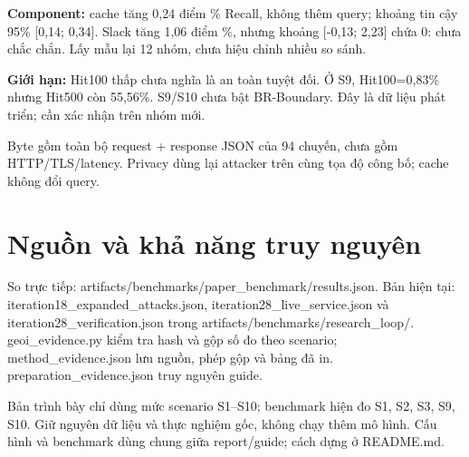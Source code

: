 \documentclass[10pt,a4paper]{article}
\begin{document}
\textbf{Component:} cache tăng 0,24 điểm \% Recall, không thêm query; khoảng tin cậy 95\% [0,14; 0,34]. Slack tăng 1,06 điểm \%, nhưng khoảng [-0,13; 2,23] chứa 0: chưa chắc chắn. Lấy mẫu lại 12 nhóm, chưa hiệu chỉnh nhiều so sánh.

\textbf{Giới hạn:} Hit100 thấp chưa nghĩa là an toàn tuyệt đối. Ở S9, Hit100=0,83\% nhưng Hit500 còn 55,56\%. S9/S10 chưa bật BR-Boundary. Đây là dữ liệu phát triển; cần xác nhận trên nhóm mới.

Byte gồm toàn bộ request + response JSON của 94 chuyến, chưa gồm HTTP/TLS/latency. Privacy dùng lại attacker trên cùng tọa độ công bố; cache không đổi query.


\clearpage
\section{Nguồn và khả năng truy nguyên}\label{sec:4}
So trực tiếp: artifacts/benchmarks/paper\_\allowbreak{}benchmark/results.json. Bản hiện tại: iteration18\_\allowbreak{}expanded\_\allowbreak{}attacks.json, iteration28\_\allowbreak{}live\_\allowbreak{}service.json và iteration28\_\allowbreak{}verification.json trong artifacts/benchmarks/research\_\allowbreak{}loop/. geoi\_\allowbreak{}evidence.py kiểm tra hash và gộp số đo theo scenario; method\_\allowbreak{}evidence.json lưu nguồn, phép gộp và bảng đã in. preparation\_\allowbreak{}evidence.json truy nguyên guide.

Bản trình bày chỉ dùng mức scenario S1–S10; benchmark hiện đo S1, S2, S3, S9, S10. Giữ nguyên dữ liệu và thực nghiệm gốc, không chạy thêm mô hình. Cấu hình và benchmark dùng chung giữa report/guide; cách dựng ở README.md.
\end{document}
